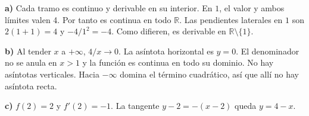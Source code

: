 \textbf{a)} Cada tramo es continuo y derivable en su interior.
En $1$, el valor y ambos límites valen 4. Por tanto es continua
en todo $\mathbb R$. Las pendientes laterales en $1$ son
$2(1+1)=4$ y $-4/1^2=-4$. Como difieren, es derivable
en $\mathbb R\setminus\{1\}$.

\textbf{b)} Al tender $x$ a $+\infty$, $4/x\to0$.
La asíntota horizontal es $\boxed{y=0}$. El denominador no se
anula en $x>1$ y la función es continua en todo su dominio.
No hay asíntotas verticales. Hacia $-\infty$ domina el
término cuadrático, así que allí no hay asíntota recta.

\textbf{c)} $f(2)=2$ y $f'(2)=-1$. La tangente
$y-2=-(x-2)$ queda $\boxed{y=4-x}$.
